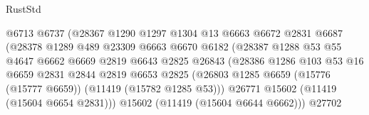 \begin{lexlean}{RustStd}
\begin{coremodule}
                                      @6713
                                      @6737
                                      (@28367
                                        @1290
                                        @1297
                                        @1304
                                        @13
                                        @6663
                                        @6672
                                        @2831
                                        @6687
                                        (@28378
                                          @1289
                                          @489
                                          @23309
                                          @6663
                                          @6670
                                          @6182
                                          (@28387
                                            @1288
                                            @53
                                            @55
                                            @4647
                                            @6662
                                            @6669
                                            @2819
                                            @6643
                                            @2825
                                            @26843
                                            (@28386
                                              @1286
                                              @103
                                              @53
                                              @16
                                              @6659
                                              @2831
                                              @2844
                                              @2819
                                              @6653
                                              @2825
                                              (@26803
                                                @1285
                                                @6659
                                                (@15776 (@15777 @6659))
                                                (@11419 (@15782 @1285 @53)))
                                              @26771
                                              @15602
                                              (@11419 (@15604 @6654 @2831)))
                                            @15602
                                            (@11419 (@15604 @6644 @6662)))
                                          @27702

\end{coremodule}
\end{lexlean}
